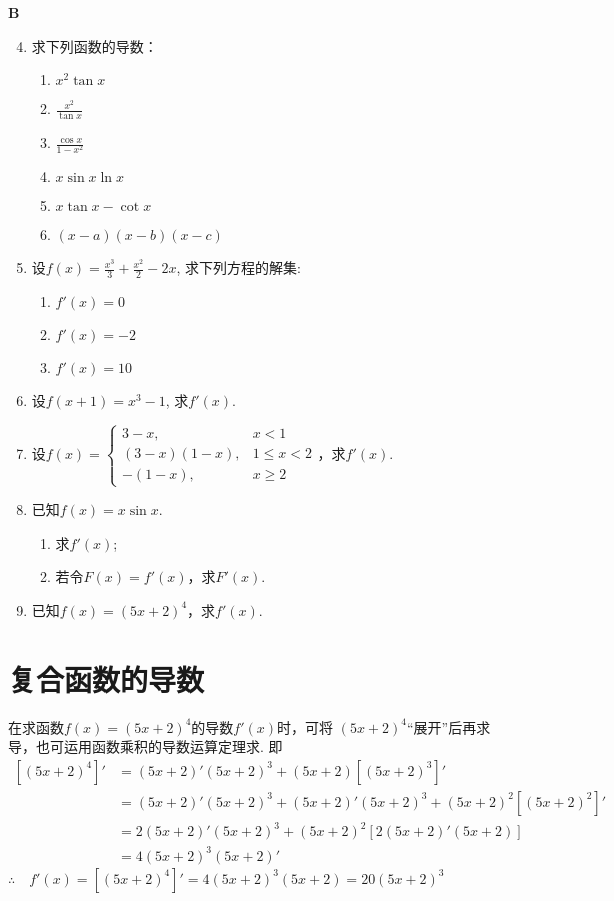 \begin{center}
    \bfseries B
\end{center}

\begin{enumerate}\setcounter{enumi}{3}
    \item 求下列函数的导数：
    \begin{multicols}{2}
    \begin{enumerate}[(1)]
\item $x^{2}\tan x$
\item $\frac{x^{2}}{\tan x}$
\item $\frac{\cos x}{1-x^{2}}$
\item $x\sin x\ln x$
\item $x\tan x-\cot x$
\item $(x-a)(x-b)(x-c)$
    \end{enumerate}    
\end{multicols}

\item 设$f(x)=\frac{x^{3}}{3}+\frac{x^{2}}{2}-2x$, 求下列方程的解集:
\begin{multicols}{3}
\begin{enumerate}[(1)]
    \item $f' (x)=0$
    \item $f' (x)=-2$
    \item $f' (x)=10$
\end{enumerate}
\end{multicols}

\item 设$f(x+1)=x^{3}-1$, 求$f' (x)$.
\item 设$f(x)=\begin{cases}
    3-x,& x<1\\
    (3-x)(1-x),& 1\le x<2\\
    -(1-x),& x\ge 2
\end{cases}$，求$f'(x)$.
\item 已知$f(x)=x\sin x$.
\begin{enumerate}[(1)]
\item 求$f'(x)$;
\item 若令$F(x)=f'(x)$，求$F'(x)$.
\end{enumerate}

\item 已知$f(x)=(5x+2)^4$，求$f'(x)$.
\end{enumerate}

\section{复合函数的导数}
在求函数$f(x)=(5x+2)^4$的导数$f'(x)$时，可将
$(5x+2)^4$“展开”后再求导，也可运用函数乘积的导数运算定理求. 即
\[\begin{split}
[(5x+2)^{4}]' &=(5x+2)' (5x+2)^{3}+(5x+2)[(5x+2)^{3}]' \\
&=(5x+2)' (5x+2)^{3}+(5x+2)' (5x+2)^{3}+(5x+2)^{2}[(5x+2)^{2}]' \\
&=2(5x+2)' (5x+2)^{3}+(5x+2)^{2}[2(5x+2)' (5x+2)]\\
&=4(5x+2)^{3}(5x+2)'     
\end{split}\]
$\therefore\quad f' (x)=[(5x+2)^{4}]'=4(5x+2)^{3}(5x+2)=20(5x+2)^{3}$

